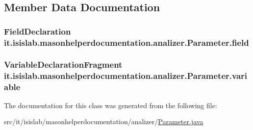 \subsection{Member Data Documentation}
\hypertarget{classit_1_1isislab_1_1masonhelperdocumentation_1_1analizer_1_1_parameter_a4ef3d7c5ebfef1eaa4de0c29576511de}{
\subsubsection[{field}]{\setlength{\rightskip}{0pt plus 5cm}Field\-Declaration it.\-isislab.\-masonhelperdocumentation.\-analizer.\-Parameter.\-field\hspace{0.3cm}{\ttfamily [private]}}}\label{classit_1_1isislab_1_1masonhelperdocumentation_1_1analizer_1_1_parameter_a4ef3d7c5ebfef1eaa4de0c29576511de}
\hypertarget{classit_1_1isislab_1_1masonhelperdocumentation_1_1analizer_1_1_parameter_a34712a73715b651bb3dd284cbf1dd1c6}{
\subsubsection[{variable}]{\setlength{\rightskip}{0pt plus 5cm}Variable\-Declaration\-Fragment it.\-isislab.\-masonhelperdocumentation.\-analizer.\-Parameter.\-variable\hspace{0.3cm}{\ttfamily [private]}}}\label{classit_1_1isislab_1_1masonhelperdocumentation_1_1analizer_1_1_parameter_a34712a73715b651bb3dd284cbf1dd1c6}


The documentation for this class was generated from the following file\-:\begin{DoxyCompactItemize}
\item 
src/it/isislab/masonhelperdocumentation/analizer/\hyperlink{_parameter_8java}{Parameter.\-java}\end{DoxyCompactItemize}
